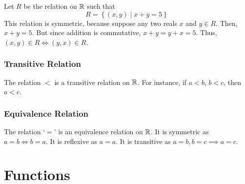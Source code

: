 
\begin{example}
    Let \(R\) be the relation on \(\mathbb R\) such that \[
        R = \left\{(x,y) \mid x + y = 5\right\}
    \]
    This relation is symmetric, because suppose any two reals \(x\) and \(y \in R\). Then,
    \(x + y = 5\). But since addition is commutative, \(x + y = y + x = 5\). 
    Thus, \((x,y) \in R \iff (y,x) \in R\).
\end{example}

\subsubsection{Transitive Relation}


\begin{example}
    The relation \(<\) is a transitive relation on \(\mathbb R\). For instance, if \(a < b\), \(b < c\),
    then \(a < c\).
\end{example}

\subsubsection{Equivalence Relation}



\begin{example}
    The relation `\(=\)' is an equivalence relation on \(\mathbb R\). It is symmetric as \(a = b \iff b = a\). 
    It is reflexive as \(a = a\). It is transitive as \(a = b, b = c \implies a = c\).
\end{example}

\section{Functions}


